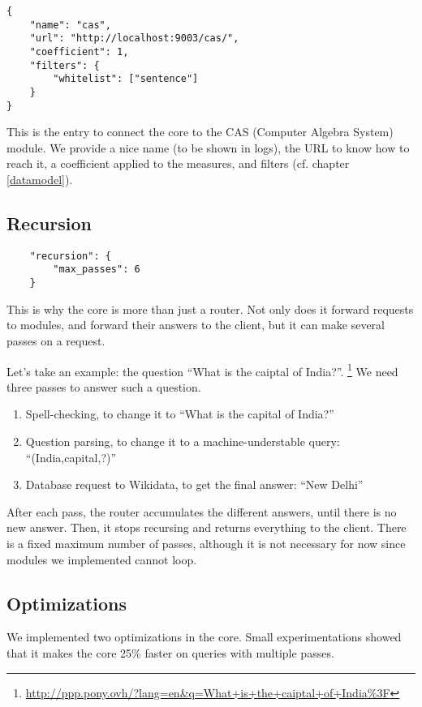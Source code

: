 \begin{verbatim}
{
    "name": "cas",
    "url": "http://localhost:9003/cas/",
    "coefficient": 1,
    "filters": {
        "whitelist": ["sentence"]
    }
}
\end{verbatim}

This is the entry to connect the core to the CAS (Computer Algebra System)
module. We provide a nice name (to be
shown in logs), the URL to know how to reach it, a coefficient applied to
the measures, and filters (cf. chapter \ref{datamodel}).

\subsection{Recursion}

\begin{verbatim}
    "recursion": {
        "max_passes": 6
    }
\end{verbatim}

This is why the core is more than just a router. Not only does it forward
requests to modules, and forward their answers to the client, but it can
make several passes on a request.

Let's take an example: the question “What is the caiptal of India?”.
\footnote{\url{http://ppp.pony.ovh/?lang=en&q=What+is+the+caiptal+of+India\%3F}}
We need three passes to answer such a question.

\begin{enumerate}
    \item Spell-checking, to change it to “What is the capital of India?”
    \item Question parsing, to change it to a machine-understable query:
        “(India,capital,?)”
    \item Database request to Wikidata, to get the final answer:
        “New Delhi”
\end{enumerate}

After each pass, the router accumulates the different answers, until
there is no new answer. Then, it stops recursing and returns everything
to the client.
There is a fixed maximum number of passes, although it is not necessary
for now since modules we implemented cannot loop.

\subsection{Optimizations}

We implemented two optimizations in the core. Small experimentations showed that
it makes the core 25\% faster on queries with multiple passes.

